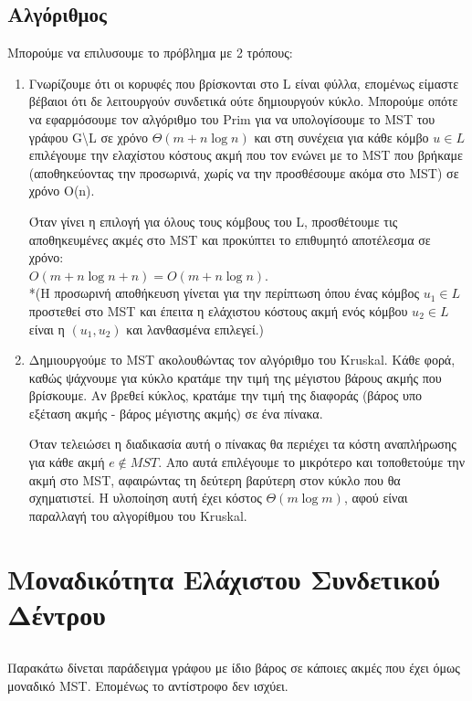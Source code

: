 \documentclass[a4paper,11pt]{article}
\newcommand{\tab}{\hspace*{3em}}
\begin{document}
\subsection{Αλγόριθμος}
Μπορούμε να επιλυσουμε το πρόβλημα με 2 τρόπους:
\begin{enumerate}
    \item Γνωρίζουμε ότι οι κορυφές που βρίσκονται στο L είναι φύλλα, επομένως
    είμαστε βέβαιοι ότι δε λειτουργούν συνδετικά ούτε δημιουργούν κύκλο.
    Μπορούμε οπότε να εφαρμόσουμε τον αλγόριθμο του Prim για να υπολογίσουμε
    το MST του γράφου G\textbackslash L σε χρόνο $\Theta (m + n \log n)$ και
    στη συνέχεια για κάθε κόμβο $u \in L$ επιλέγουμε την ελαχίστου κόστους
    ακμή που τον ενώνει με το MST που βρήκαμε (αποθηκεύοντας την προσωρινά,
    χωρίς να την προσθέσουμε ακόμα στο MST) σε χρόνο Ο(n).

    Όταν γίνει η επιλογή για όλους τους κόμβους του L, προσθέτουμε τις
    αποθηκευμένες ακμές στο MST και προκύπτει το επιθυμητό αποτέλεσμα σε
    χρόνο:\\
    $O(m + n \log n + n) = O(m + n \log n)$.\\
    \tab *(Η προσωρινή αποθήκευση γίνεται για την περίπτωση όπου ένας κόμβος
    $u_1 \in L$ προστεθεί στο MST και έπειτα η ελάχιστου κόστους ακμή ενός
    κόμβου $u_2 \in L$ είναι η $(u_1, u_2)$ και λανθασμένα επιλεγεί.)
    \item Δημιουργούμε το MST ακολουθώντας τον αλγόριθμο του Kruskal. Κάθε
    φορά, καθώς ψάχνουμε για κύκλο κρατάμε την τιμή της μέγιστου βάρους ακμής
    που βρίσκουμε. Αν βρεθεί κύκλος, κρατάμε την τιμή της διαφοράς (βάρος υπο
    εξέταση ακμής - βάρος μέγιστης ακμής) σε ένα πίνακα.

    Όταν τελειώσει η διαδικασία αυτή ο πίνακας θα περιέχει τα κόστη
    αναπλήρωσης για κάθε ακμή $e \notin MST$. Απο αυτά επιλέγουμε το μικρότερο
    και τοποθετούμε την ακμή στο MST, αφαιρώντας τη δεύτερη βαρύτερη στον
    κύκλο που θα σχηματιστεί. Η υλοποίηση αυτή έχει κόστος $\Theta (m \log m)$,
    αφού είναι παραλλαγή του αλγορίθμου του Kruskal.
    \end{enumerate}


\section{Μοναδικότητα Ελάχιστου Συνδετικού Δέντρου}
\subsection{}
Παρακάτω δίνεται παράδειγμα γράφου με ίδιο βάρος σε κάποιες ακμές που έχει
όμως μοναδικό MST. Επομένως το αντίστροφο δεν ισχύει.
\end{document}
